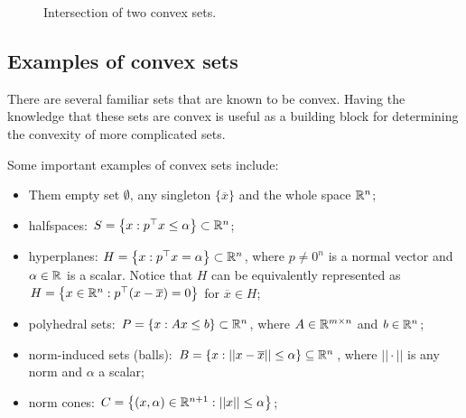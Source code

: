 %
\begin{figure}
	\centering
    
    \caption{Intersection of two convex sets.} \label{fig:intersection}
\end{figure}
%

\subsection{Examples of convex sets}

There are several familiar sets that are known to be convex. Having the knowledge that these sets are convex is useful as a building block for determining the convexity of more complicated sets.

Some important examples of convex sets include:
\begin{itemize}
	\item Them empty set $\emptyset$, any singleton $\{\overline{x}\}$ and the whole space $\mathbb{R}^n$; 
	\item halfspaces: $S = \left\{ x : p^\top x \leq \alpha \right \} \subset \mathbb{R}^n$;
	\item hyperplanes: $H = \left\{ x : p^\top x = \alpha \right \} \subset \mathbb{R}^n$, where $p \neq 0^n$ is a normal vector and $\alpha\in \mathbb{R}$ is a scalar. Notice that $H$ can be equivalently represented as $H = \left\{ x \in \mathbb{R}^n: p^\top(x - \overline{x}) = 0 \right \}$ for $\overline{x} \in H$;
	\item polyhedral sets: $P = \left\{ x : Ax \leq b \right \} \subset \mathbb{R}^n$, where $A\in \mathbb{R}^{m\times n}$ and $b \in \mathbb{R}^n$;
	\item norm-induced sets (balls): $B = \left\{ x : ||x - \overline{x}|| \leq \alpha \right \} \subseteq \mathbb{R}^n$, where $|| \cdot ||$ is any norm and $\alpha$ a scalar;
	\item norm cones: $C =\left\{ (x,\alpha) \in \mathbb{R}^{n+1}: ||x|| \leq \alpha \right \} $;
\end{itemize} 

